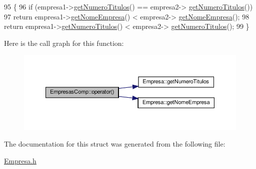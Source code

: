 \begin{DoxyCode}
95     \{
96         \textcolor{keywordflow}{if} (empresa1->\hyperlink{classEmpresa_a49b2b94a54bbc341822f64fc194f98fd}{getNumeroTitulos}() == empresa2->
      \hyperlink{classEmpresa_a49b2b94a54bbc341822f64fc194f98fd}{getNumeroTitulos}())
97             \textcolor{keywordflow}{return} empresa1->\hyperlink{classEmpresa_a99bc2de98a0c0348abb74c93e6e7159e}{getNomeEmpresa}() < empresa2->
      \hyperlink{classEmpresa_a99bc2de98a0c0348abb74c93e6e7159e}{getNomeEmpresa}();
98         \textcolor{keywordflow}{return} empresa1->\hyperlink{classEmpresa_a49b2b94a54bbc341822f64fc194f98fd}{getNumeroTitulos}() < empresa2->
      \hyperlink{classEmpresa_a49b2b94a54bbc341822f64fc194f98fd}{getNumeroTitulos}();
99     \}
\end{DoxyCode}
Here is the call graph for this function\+:
\nopagebreak
\begin{figure}[H]
\begin{center}
\leavevmode
\includegraphics[width=350pt]{structEmpresasComp_a65f437399b6aa939ee84611a69ee0ad0_cgraph}
\end{center}
\end{figure}


The documentation for this struct was generated from the following file\+:\begin{DoxyCompactItemize}
\item 
\hyperlink{Empresa_8h}{Empresa.\+h}\end{DoxyCompactItemize}
